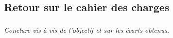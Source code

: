 \documentclass[10pt,fleqn]{article} %
\begin{document}
\begin{multicols}{2}
\subsection*{Retour sur le cahier des charges}

\subparagraph{}
\textit{Conclure vis-à-vis de l'objectif et sur les écarts obtenus.}
\ifprof
\begin{corrige}
\end{corrige}
\else
\fi



\ifprof
\else
\end{multicols}
\fi

\newpage

\setcounter{exo}{0}
\end{document}
